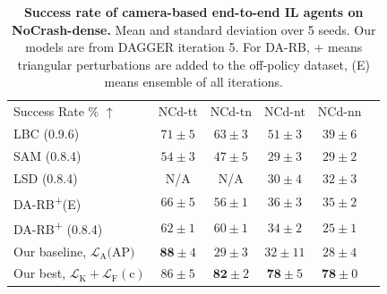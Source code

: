 \begin{table}
	\setlength{\tabcolsep}{2.67pt}
	\centering
	\begin{tabular}{lccccc}
		\toprule
		Success Rate \% $\uparrow$
		&  NCd-tt & NCd-tn  & NCd-nt & NCd-nn  \\ 
		\cmidrule(lr){1-1}\cmidrule(lr){2-5}
		LBC \cite{chen2020learning} (0.9.6) & 
		$71 \pm 5$ & $63 \pm 3$ & $51 \pm 3$ & $39 \pm 6$ \\
		SAM \cite{zhao2021sam} (0.8.4) & 
		$54 \pm 3$ & $47 \pm 5$ & $29 \pm 3$ & $29 \pm 2$ \\
		LSD \cite{ohn2020learning} (0.8.4) & 
		N/A & N/A & $30 \pm 4$ & $32 \pm 3$ \\
		DA-RB\textsuperscript{+}(E) \cite{prakash2020exploring} & 
		$66 \pm 5$ & $56 \pm 1$ & $36 \pm 3$ & $35 \pm 2$ \\
		DA-RB\textsuperscript{+} \cite{prakash2020exploring} (0.8.4)  & 
		$62 \pm 1$ & $60 \pm 1$ & $34 \pm 2$ & $25 \pm 1$ \\
		Our baseline, $\mathcal{L}_\text{A}\text{(AP)}$ & 
		$\mathbf{88} \pm 4$ & $29 \pm 3$ & $32 \pm 11$ & $28 \pm 4$ \\
		Our best, $\mathcal{L}_\text{K}+\mathcal{L}_\text{F}(\text{c})$ & 
		$86 \pm 5$ & $\mathbf{82} \pm 2$ & $\mathbf{78} \pm 5$ & $\mathbf{78} \pm 0$ \\
		\bottomrule
	\end{tabular}
	\vspace{-1ex}
	\caption{\textbf{Success rate of camera-based end-to-end IL agents on NoCrash-dense.}
		Mean and standard deviation over 5 seeds. 
		Our models are from DAGGER iteration 5. 
		For DA-RB, + means triangular perturbations are added to the off-policy dataset, (E) means ensemble of all iterations.}
	\label{table:sucess_rate_nc_dense}
	\vspace{-2ex}
\end{table}

